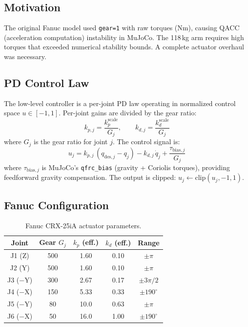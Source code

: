 \documentclass[11pt,letterpaper]{article}
\begin{document}
\subsection{Motivation}

The original Fanuc model used \texttt{gear=1} with raw torques (Nm), causing QACC (acceleration computation) instability in MuJoCo.  The 118\,kg arm requires high torques that exceeded numerical stability bounds.  A complete actuator overhaul was necessary.

\subsection{PD Control Law}

The low-level controller is a per-joint PD law operating in normalized control space $u \in [-1, 1]$.  Per-joint gains are divided by the gear ratio:
\begin{equation}
    k_{p,j} = \frac{k_p^{\text{scale}}}{G_j}, \qquad k_{d,j} = \frac{k_d^{\text{scale}}}{G_j}
\end{equation}
where $G_j$ is the gear ratio for joint $j$.  The control signal is:
\begin{equation}
    u_j = k_{p,j}\,(q_{\text{des},j} - q_j) - k_{d,j}\,\dot{q}_j + \frac{\tau_{\text{bias},j}}{G_j}
    \label{eq:pd_control}
\end{equation}
where $\tau_{\text{bias},j}$ is MuJoCo's \texttt{qfrc\_bias} (gravity + Coriolis torques), providing feedforward gravity compensation.  The output is clipped: $u_j \leftarrow \text{clip}(u_j, -1, 1)$.

\subsection{Fanuc Configuration}

\begin{table}[H]
\centering\small
\caption{Fanuc CRX-25iA actuator parameters.}
\begin{tabular}{@{}ccccc@{}}
\toprule
Joint & Gear $G_j$ & $k_p$ (eff.) & $k_d$ (eff.) & Range \\
\midrule
J1 (Z) & 500 & 1.60 & 0.10 & $\pm\pi$ \\
J2 (Y) & 500 & 1.60 & 0.10 & $\pm\pi$ \\
J3 ($-$Y) & 300 & 2.67 & 0.17 & $\pm 3\pi/2$ \\
J4 ($-$X) & 150 & 5.33 & 0.33 & $\pm 190^{\circ}$ \\
J5 ($-$Y) & 80 & 10.0 & 0.63 & $\pm\pi$ \\
J6 ($-$X) & 50 & 16.0 & 1.00 & $\pm 190^{\circ}$ \\
\bottomrule
\end{tabular}
\end{table}
\end{document}

